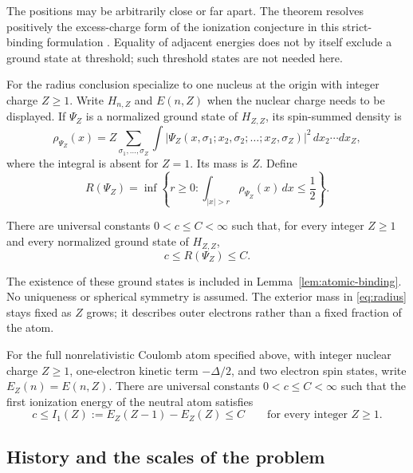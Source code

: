 The positions may be arbitrarily close or far apart. The theorem resolves
positively the excess-charge form of the ionization conjecture in this
strict-binding formulation \citep{Simon2000,Lewin2025OpenProblems}.
Equality of adjacent energies does not by
itself exclude a ground state at threshold; such threshold states are not
needed here.

For the radius conclusion specialize to one nucleus at the origin with
integer charge $Z\ge1$. Write $H_{n,Z}$ and $E(n,Z)$ when the nuclear
charge needs to be displayed. If $\Psi_Z$ is a normalized ground state of
$H_{Z,Z}$, its spin-summed density is
\[
 \rho_{\Psi_Z}(x)=Z\sum_{\sigma_1,\ldots,\sigma_Z}
 \int |\Psi_Z(x,\sigma_1;x_2,\sigma_2;\ldots;x_Z,\sigma_Z)|^2
                         \,dx_2\cdots dx_Z,
\]
where the integral is absent for $Z=1$. Its mass is $Z$. Define
\begin{equation}\label{eq:radius}
 R(\Psi_Z)=\inf\left\{r\ge0:
       \int_{|x|>r}\rho_{\Psi_Z}(x)\,dx\le\frac12\right\}.
\end{equation}

\begin{theorem}\label{thm:radius}
There are universal constants $0<c\le C<\infty$ such that, for every
integer $Z\ge1$ and every normalized ground state of $H_{Z,Z}$,
\[
 c\le R(\Psi_Z)\le C.
\]
\end{theorem}

The existence of these ground states is included in
Lemma~\ref{lem:atomic-binding}. No uniqueness or spherical symmetry is
assumed. The exterior mass in \eqref{eq:radius} stays fixed as $Z$ grows;
it describes outer electrons rather than a fixed fraction of the atom.

\begin{corollary}\label{cor:first-ionization}
For the full nonrelativistic Coulomb atom specified above, with integer
nuclear charge $Z\ge1$, one-electron kinetic term $-\Delta/2$, and two
electron spin states, write $E_Z(n)=E(n,Z)$. There are universal constants
$0<c\le C<\infty$ such that the first ionization energy of the neutral atom
satisfies
\[
 c\le I_1(Z):=E_Z(Z-1)-E_Z(Z)\le C
 \qquad\text{for every integer }Z\ge1.
\]
\end{corollary}

\subsection{History and the scales of the problem}


